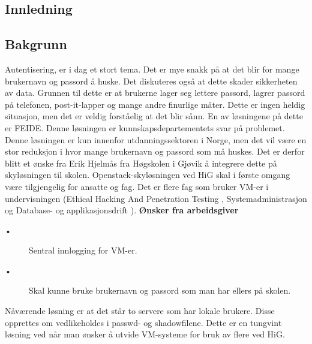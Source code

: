 \begin{center}
	\chapter{Innledning}
\end{center}
\section{Bakgrunn}
Autentisering, er i dag et stort tema. Det er mye snakk på at det blir for mange brukernavn og passord å huske. Det diskuteres også at dette skader sikkerheten av data. Grunnen til dette er at brukerne lager seg lettere passord, lagrer passord på telefonen, post-it-lapper og mange andre finurlige måter. Dette er ingen heldig situasjon, men det er veldig forståelig at det blir sånn. \newline \newline
En av løsningene på dette er FEIDE\cite{Omfeide}. Denne løsningen er kunnskapsdepartementets svar på problemet. Denne løsningen er kun innenfor utdanningssektoren i Norge, men det vil være en stor reduksjon i hvor mange brukernavn og passord som må huskes. \newline \newline
Det er derfor blitt et ønske fra Erik Hjelmås fra Høgskolen i Gjøvik å integrere dette på skyløsningen til skolen. Openstack-skyløsningen ved HiG skal i første omgang være tilgjengelig for ansatte og fag. Det er flere fag som bruker VM-er i undervisningen (Ethical Hacking And Penetration Testing \cite{imt3491}, Systemadministrasjon \cite{imt3292} og Database- og applikasjonsdrift \cite{imt3441}). \newline \newline
\textbf{Ønsker fra arbeidsgiver}
\begin{description}
	\item[\tab •] Sentral innlogging for VM-er.
	\item[\tab •] Skal kunne bruke brukernavn og passord som man har ellers på skolen.
\end{description}
Nåværende løsning er at det står to servere som har lokale brukere. Disse opprettes om vedlikeholdes i passwd- og shadowfilene. Dette er en tungvint løsning ved når man ønsker å utvide VM-systeme for bruk av flere ved HiG.

\newpage
